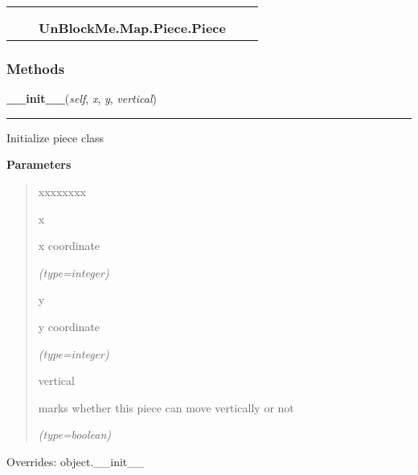    \label{UnBlockMe:Map:Piece:Piece}
\begin{tabular}{cccccc}
\multicolumn{2}{r}{\settowidth{\BCL}{object}\multirow{2}{\BCL}{object}}
&&
  \\\cline{3-3}
  &&\multicolumn{1}{c|}{}
&&
  \\
&&\multicolumn{2}{l}{\textbf{UnBlockMe.Map.Piece.Piece}}
\end{tabular}



  \subsubsection{Methods}

    \vspace{0.5ex}

\hspace{.8\funcindent}\begin{boxedminipage}{\funcwidth}

    \raggedright \textbf{\_\_init\_\_}(\textit{self}, \textit{x}, \textit{y}, \textit{vertical})

    \vspace{-1.5ex}

    \rule{\textwidth}{0.5\fboxrule}
\setlength{\parskip}{2ex}
    Initialize piece class

\setlength{\parskip}{1ex}
      \textbf{Parameters}
      \vspace{-1ex}

      \begin{quote}
        \begin{Ventry}{xxxxxxxx}

          \item[x]

          x coordinate

            {\it (type=integer)}

          \item[y]

          y coordinate

            {\it (type=integer)}

          \item[vertical]

          marks whether this piece can move vertically or not

            {\it (type=boolean)}

        \end{Ventry}

      \end{quote}

      Overrides: object.\_\_init\_\_

    \end{boxedminipage}

